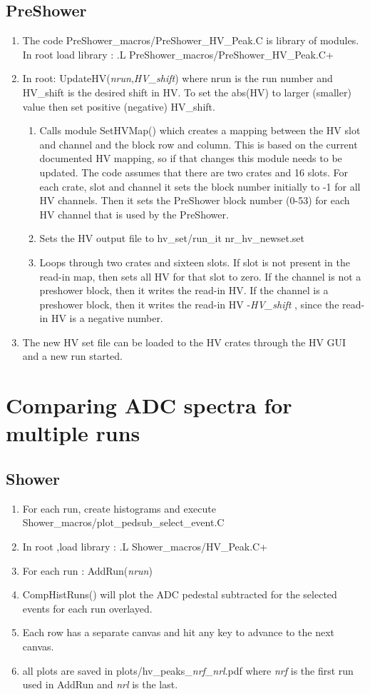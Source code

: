 \documentclass[]{article}
\begin{document}
\subsection{PreShower}
\begin{enumerate}
	\item The code PreShower\_macros/PreShower\_HV\_Peak.C is library of modules. In root load library : .L PreShower\_macros/PreShower\_HV\_Peak.C+
	\item In root: UpdateHV({\it nrun},{\it HV\_shift}) where nrun is the run number and HV\_shift is the desired shift in HV. To set the abs(HV) to larger (smaller) value then set positive (negative) HV\_shift.
	\begin{enumerate}
		\item Calls module SetHVMap() which creates a mapping between the HV slot and channel and the block row and column. This is based on the current documented HV mapping, so if that changes this module needs to be updated. The code assumes that there are two crates and 16 slots. For each crate, slot and channel it sets the block number initially to -1 for all HV channels. Then it sets the PreShower block number (0-53) for each HV channel that is used by the PreShower.
		\item Sets the HV output file to hv\_set/run\_{it nr}\_hv\_newset.set
		\item Loops through two crates and sixteen slots. If slot is not present in the read-in map, then sets all HV for that slot to zero. If the channel is not a preshower block, then it writes the read-in HV. If the channel is a preshower block, then it writes the read-in HV -{\it HV\_shift} , since the read-in HV is a negative number.
	\end{enumerate}
	\item The new HV set file can be loaded to the HV crates through the HV GUI and a new run started. 
\end{enumerate}
\section{Comparing ADC spectra for multiple runs}
\subsection{Shower}
\begin{enumerate}
	\item For each run, create histograms and execute Shower\_macros/plot\_pedsub\_select\_event.C
	\item In root ,load library : .L Shower\_macros/HV\_Peak.C+
	\item For each run : AddRun({\it nrun}) 
	\item CompHistRuns() will plot the ADC pedestal subtracted for the selected events for each run overlayed. \item Each row has a separate canvas and hit any key to advance to the next canvas.
	\item all plots are saved in plots/hv\_peaks\_{\it nrf}\_{\it nrl}.pdf where {\it nrf} is the first run used in AddRun and {\it nrl} is the last.
\end{enumerate}
\end{document}
